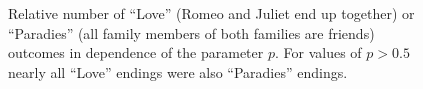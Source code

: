 \documentclass{scrartcl}
\begin{document}
\begin{figure}
    \centering
    \caption{Relative number of \enquote{Love} (Romeo and Juliet end up
    together) or \enquote{Paradies} (all family members of both families
    are friends) outcomes in dependence of the parameter $p$. For values of $p > 0.5$ nearly all
    \enquote{Love} endings were also \enquote{Paradies} endings.}
    \label{fig:D412}
\end{figure}
\end{document}
